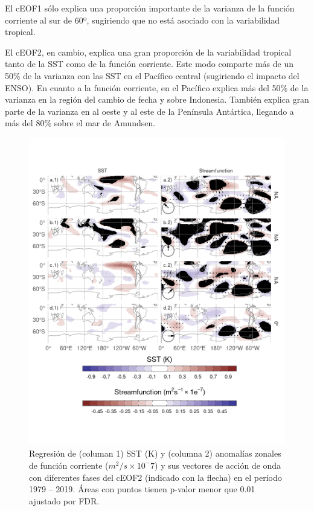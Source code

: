 \documentclass[12pt,oneside]{reedthesis}
\begin{document}
El cEOF1 sólo explica una proporción importante de la varianza de la función corriente al sur de 60º, sugiriendo que no está asociado con la variabilidad tropical.

El cEOF2, en cambio, explica una gran proporción de la variabilidad tropical tanto de la SST como de la función corriente.
Este modo comparte más de un 50\% de la varianza con las SST en el Pacífico central (sugiriendo el impacto del ENSO).
En cuanto a la función corriente, en el Pacífico explica más del 50\% de la varianza en la región del cambio de fecha y sobre Indonesia.
También explica gran parte de la varianza en al oeste y al este de la Península Antártica, llegando a más del 80\% sobre el mar de Amundsen.




\begin{figure}
\includegraphics{figures/20-ceofs/sst-psi-2-1} \caption{Regresión de (columan 1) SST (K) y (columna 2) anomalías zonales de función corriente (\(m^2/s\times10^-7\)) y sus vectores de acción de onda con diferentes fases del cEOF2 (indicado con la flecha) en el período 1979 -- 2019.
Áreas con puntos tienen p-valor menor que 0.01 ajustado por FDR.}\label{fig:sst-psi-2}
\end{figure}
\end{document}
